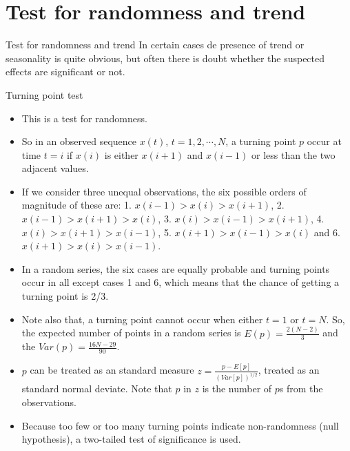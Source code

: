 \documentclass[8pt]{beamer}
\renewcommand{\emph}[1]{\textcolor{myorange}{#1}}
\begin{document}
\section{Test for randomness and trend}
\begin{frame}{Test for randomness and trend}
In certain cases de presence of \emph{trend} or \emph{seasonality} is quite obvious, but often there is doubt whether the suspected effects are significant or not. 
\begin{block}{Turning point test}
\end{block}
    \begin{itemize}
        \item This is a test for \emph{randomness}. 
        \item So in an observed sequence $x(t)$, $t=1,2,\cdots,N$, a \alert{turning point} $p$ occur at time $t=i$ if $x(i)$ is either $x(i+1)$ and $x(i-1)$ or less than the two adjacent values. 
        \item If we consider  three unequal observations, the six possible orders of magnitude of these are: 1. $x(i-1)>x(i) > x(i+1)$, 2. $x(i-1)>x(i+1)>x(i)$, 3. $x(i) > x(i-1) > x(i+1)$, 4. $x(i) > x(i+1) > x(i-1)$, 5. $x(i+1) > x(i-1) > x(i)$ and 6. $x(i+1) > x(i) > x(i-1)$. 
        \item In a random series, the six cases are equally probable and \emph{turning points} occur in all except cases 1 and 6, which means that the chance of  getting a \emph{turning point} is \emph{2/3}. 
        \item Note also that, a \emph{turning point} cannot occur when either $t=1$ or $t=N$. So, the expected number of points in a random series is $E(p) = \frac{2(N-2)}{3}$ and the $Var(p) = \frac{16N-29}{90}$. 
        \item $p$ can be treated as an \emph{standard measure} $z=\frac{p-E[p]}{(Var[p])^{1/2}}$, treated as an \emph{standard normal deviate}. Note that $p$ in $z$ is the number of $p$s from the observations. 
        \item Because too few or too many turning points indicate \emph{non-randomness} (\emph{null hypothesis}), a \emph{two-tailed test of significance is used}.
    \end{itemize}
\end{frame}
\end{document}
